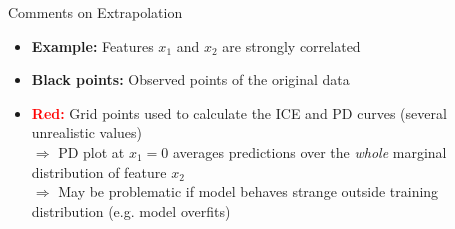 \documentclass[11pt,compress,t,notes=noshow, aspectratio=169, xcolor=table]{beamer}
\begin{document}
\begin{frame}{Comments on Extrapolation}
\begin{itemize}
\item \textbf{Example:} Features $x_1$ and $x_2$ are strongly correlated
\item \textbf{Black points:} Observed points of the original data
\item \textbf{\textcolor{red}{Red:}} Grid points used to calculate the ICE and PD curves (several unrealistic values)\\ %
$\Rightarrow$ %
PD plot at $x_1=0$ averages predictions over the \textit{whole} marginal distribution of feature $x_2$\\
$\Rightarrow$ May be problematic if model behaves strange outside training distribution (e.g. model overfits)
\end{itemize}

%
%
%
%
\end{frame}
\end{document}

